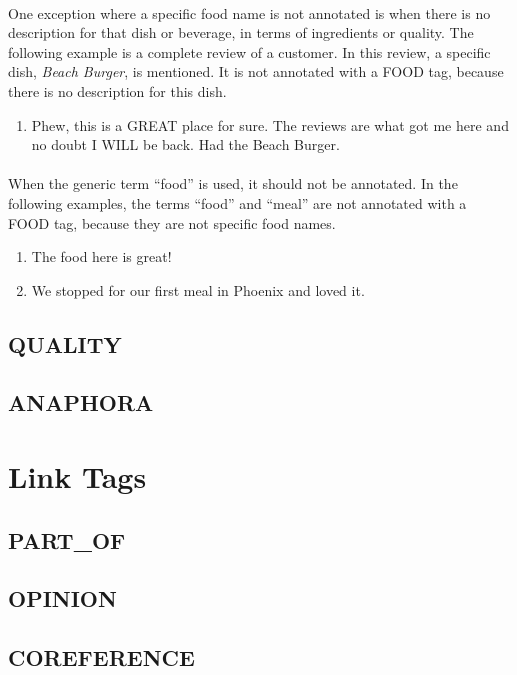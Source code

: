 \documentclass{article}
\begin{document}
\paragraph{}
One exception where a specific food name is not annotated is when there is no description for that dish or beverage, in terms of ingredients or quality. The following example is a complete review of a customer. In this review, a specific dish, \textit{Beach Burger}, is mentioned. It is not annotated with a FOOD tag, because there is no description for this dish.

\begin{enumerate}[resume]
\item Phew, this is a GREAT place for sure. The reviews are what got me here and no doubt I WILL be back. Had the Beach Burger.
\end{enumerate}

\paragraph{}
When the generic term ``food'' is used, it should not be annotated. In the following examples, the terms ``food'' and ``meal'' are not annotated with a FOOD tag, because they are not specific food names. 
\begin{enumerate}[resume]
\item The food here is great!
\item We stopped for our first meal in Phoenix and loved it.
\end{enumerate}


\subsection{QUALITY}



\subsection{ANAPHORA}



\newpage
\section{Link Tags}


\subsection{PART\_OF}


\subsection{OPINION}


\subsection{COREFERENCE}
\end{document}
